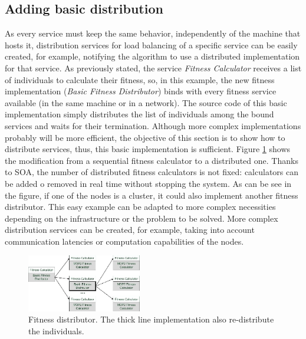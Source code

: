 \subsection{Adding basic distribution}
\label{sec:distribution}

As every service must keep the same behavior, independently of the machine that hosts it, distribution services for load balancing of a specific service can be easily created, for example, notifying the algorithm to use a distributed implementation for that service. As previously stated, the service {\em Fitness Calculator} receives a list of individuals to calculate their fitness, so, in this example, the new fitness implementation ({\em Basic Fitness Distributor}) binds with every fitness service available (in the same machine or in a network). The source code of this basic implementation simply distributes the list of individuals among the bound services and waits for their termination. Although more complex implementations probably will be more efficient, the objective of this section is to show how to distribute services, thus, this basic implementation is sufficient. Figure \ref{FITNESSDISTRIBUTOR} shows the modification from a sequential fitness calculator to a distributed one. Thanks to SOA, the number of distributed fitness calculators is not fixed: calculators can be added o removed in real time without stopping the system. As can be see in the figure, if one of the nodes is a cluster, it could also  implement another fitness distributor. This easy example can be adapted to more complex necessities depending on the infrastructure or the problem to be solved. More complex distribution services can be created, for example, taking into account communication latencies or computation capabilities of the nodes.




\begin{figure}
\centering
\includegraphics[width=5cm]{gfx/soaea/fitnessdistributor.jpg}
\caption{Fitness distributor. The thick line implementation also re-distribute the individuals.}
\label{FITNESSDISTRIBUTOR}
\end{figure}



